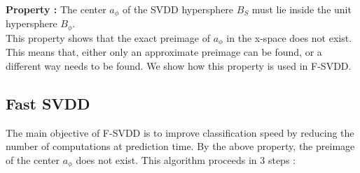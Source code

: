 \documentclass{article} %
\begin{document}
\textbf{Property :} The center $a_\phi$ of the SVDD hypersphere $B_S$ must lie inside the unit hypersphere $B_{\phi}$. \\[10pt]


This property shows that the exact preimage of $a_\phi$ in the x-space does not exist. This means that, either only an approximate preimage can be found, or a different way needs to be found. We show how this property is used in F-SVDD.

\subsection{Fast SVDD}
The main objective of F-SVDD is to improve classification speed by reducing the number of computations at prediction time. By the above property, the preimage of the center $a_\phi$ does not exist. This algorithm proceeds in 3 steps :
\end{document}
